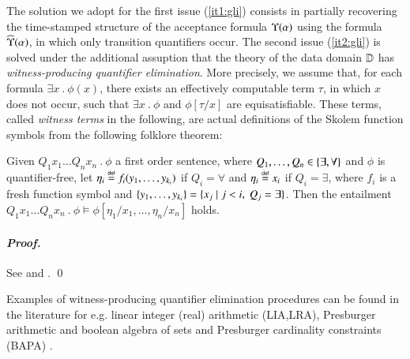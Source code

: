 The solution we adopt for the first issue (\ref{it1:gli}) consists in
partially recovering the time-stamped structure of the acceptance
formula $\Upsilon({\alpha})$ using the formula $\widehat{\Upsilon}({\alpha})$, in
which only transition quantifiers occur. The second issue
(\ref{it2:gli}) is solved under the additional assuption that the
theory of the data domain $\mathbb{D}$ has \emph{witness-producing
  quantifier elimination}. More precisely, we assume that, for each
formula $\exists x ~.~ \phi(x)$, there exists an effectively
computable term $\tau$, in which $x$ does not occur, such that
$\exists x ~.~ \phi$ and $\phi[\tau/x]$ are equisatisfiable. These
terms, called \emph{witness terms} in the following, are actual
definitions of the Skolem function symbols from the following folklore
theorem:

\begin{theorem}\label{thm:skolem}
  Given $Q_1 x_1 \ldots Q_n x_n ~.~ \phi$ a first order sentence,
  where $Q_1, \ldots, Q_n \in \{ \exists,\forall \}$ and $\phi$ is
  quantifier-free, let $\eta_i \stackrel{\scriptscriptstyle{\mathsf{def}}}{=} f_i(y_1,\ldots,y_{k_i})$ if $Q_i
  = \forall$ and $\eta_i \stackrel{\scriptscriptstyle{\mathsf{def}}}{=} x_i$ if $Q_i = \exists$, where $f_i$
  is a fresh function symbol and $\{ y_1, \ldots, y_{k_i} \} =
  \{ x_j \mid j < i,~ Q_j = \exists \}$. Then the entailment \(Q_1 x_1
  \ldots Q_n x_n ~.~ \phi \models \phi[\eta_1/x_1,\ldots,\eta_n/x_n]\)
  holds.
\end{theorem}
\paragraph{\em Proof.} See \cite[Theorem 2.1.8]{BorgerGraedelGurevich97} and
  \cite[Lemma 2.1.9]{BorgerGraedelGurevich97}. \qed

Examples of witness-producing quantifier elimination procedures can be
found in the literature for e.g. linear integer (real) arithmetic
(LIA,LRA), Presburger arithmetic and boolean algebra of sets and
Presburger cardinality constraints (BAPA)
\cite{KuncakMayerPiskacSuter12}.  


